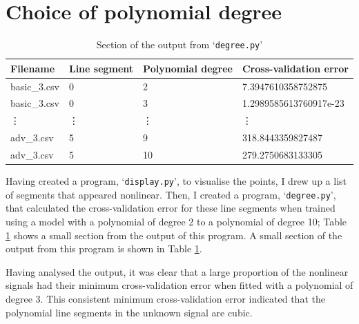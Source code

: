 \documentclass[onecolumn, 12pt, a4paper]{article}
\begin{document}
\section{Choice of polynomial degree}

\begin{table}[htbp]
    \begin{center}
        \caption{\label{tab:degree.py}Section of the output from `\texttt{degree.py}'}
    \begin{tabular}{l l l l} 
        \hline\hline
        Filename & Line segment & Polynomial degree & Cross-validation error \\ [0.5ex] 
        \hline
        basic\_3.csv & 0 & 2 & 7.3947610358752875 \\ 
        basic\_3.csv & 0 & 3 & 1.2989585613760917e-23 \\
        \vdots & \vdots & \vdots & \vdots \\
        adv\_3.csv & 5 & 9 & 318.8443359827487 \\
        adv\_3.csv & 5 & 10 & 279.2750683133305 \\
        \hline
    \end{tabular}
    \end{center}
\end{table}

Having created a program, `\texttt{display.py}', to visualise
the points, I drew up a list of segments that appeared 
nonlinear.
Then, I created a program, `\texttt{degree.py}', that calculated
the cross-validation error for these line segments
when trained using a model with a polynomial of degree 2
to a polynomial of degree 10; Table \ref{tab:degree.py}
shows a small section from the output of this program.
A small section of the output
from this program is shown in Table \ref{tab:degree.py}.

Having analysed the output, it was clear that a large
proportion of the nonlinear signals had their minimum
cross-validation error when fitted with a polynomial of degree
3.
This consistent minimum cross-validation error indicated
that the polynomial line segments in the unknown signal are cubic.
\end{document}
